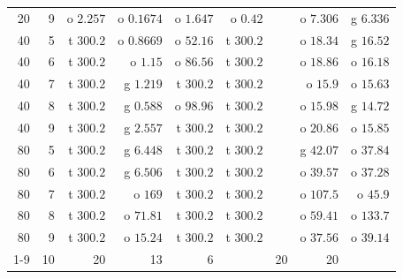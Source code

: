 \begin{table}[ht]
\begin{tabular}{@{}rrrrrrrrr@{}}
20 & 9 & o $2.257$ & o $0.1674$ & o $1.647$ & o $0.42$ &  & o $7.306$ & g $6.336$\\
40 & 5 & t $300.2$ & o $0.8669$ & o $52.16$ & t $300.2$ &  & o $18.34$ & g $16.52$\\
40 & 6 & t $300.2$ & o $1.15$ & o $86.56$ & t $300.2$ &  & o $18.86$ & o $16.18$\\
40 & 7 & t $300.2$ & g $1.219$ & t $300.2$ & t $300.2$ &  & o $15.9$ & o $15.63$\\
40 & 8 & t $300.2$ & g $0.588$ & o $98.96$ & t $300.2$ &  & o $15.98$ & g $14.72$\\
40 & 9 & t $300.2$ & g $2.557$ & t $300.2$ & t $300.2$ &  & o $20.86$ & o $15.85$\\
80 & 5 & t $300.2$ & g $6.448$ & t $300.2$ & t $300.2$ &  & g $42.07$ & o $37.84$\\
80 & 6 & t $300.2$ & g $6.506$ & t $300.2$ & t $300.2$ &  & o $39.57$ & o $37.28$\\
80 & 7 & t $300.2$ & o $169$ & t $300.2$ & t $300.2$ &  & o $107.5$ & o $45.9$\\
80 & 8 & t $300.2$ & o $71.81$ & t $300.2$ & t $300.2$ &  & o $59.41$ & o $133.7$\\
80 & 9 & t $300.2$ & o $15.24$ & t $300.2$ & t $300.2$ &  & o $37.56$ & o $39.14$\\
\cmidrule{1-9}
\multicolumn{2}{@{}l}{Solved} & 10 & 20 & 13 & 6 &  & 20 & 20\\
\bottomrule
\end{tabular}
\end{table}

